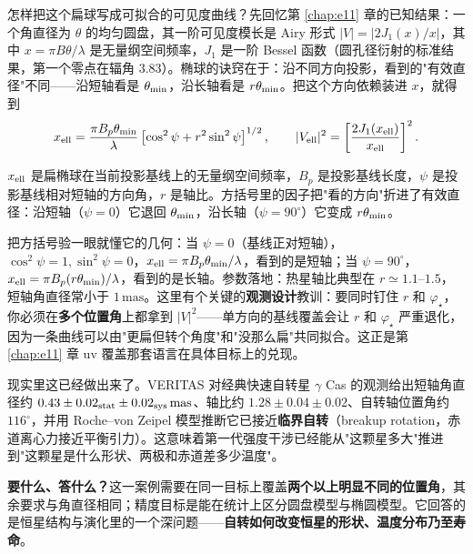 怎样把这个扁球写成可拟合的可见度曲线？先回忆第 \ref{chap:e11} 章的已知结果：一个角直径为 \(\theta\) 的均匀圆盘，其一阶可见度模长是 Airy 形式 \(|V|=|2J_1(x)/x|\)，其中 \(x=\pi B\theta/\lambda\) 是无量纲空间频率，\(J_1\) 是一阶 Bessel 函数（圆孔径衍射的标准结果，第一个零点在辐角 \(3.83\)）。椭球的诀窍在于：沿不同方向投影，看到的"有效直径"不同——沿短轴看是 \(\theta_{\rm min}\)，沿长轴看是 \(r\theta_{\rm min}\)。把这个方向依赖装进 \(x\)，就得到
\begin{equation}
  x_{\rm ell}
  =
  \frac{\pi B_p\theta_{\rm min}}{\lambda}
  \left[
  \cos^2\psi
  +
  r^2\sin^2\psi
  \right]^{1/2},
  \qquad
  |V_{\rm ell}|^2
  =
  \left[\frac{2J_1(x_{\rm ell})}{x_{\rm ell}}\right]^2 .
  \label{eq:e25-elliptical-visibility}
\end{equation}
\begin{formulaexplain}
\(x_{\rm ell}\) 是扁椭球在当前投影基线上的无量纲空间频率，\(B_p\) 是投影基线长度，\(\psi\) 是投影基线相对短轴的方向角，\(r\) 是轴比。方括号里的因子把"看的方向"折进了有效直径：沿短轴（\(\psi=0\)）它退回 \(\theta_{\rm min}\)，沿长轴（\(\psi=90^\circ\)）它变成 \(r\theta_{\rm min}\)。
\end{formulaexplain}
把方括号验一眼就懂它的几何：当 \(\psi=0\)（基线正对短轴），\(\cos^2\psi=1,\sin^2\psi=0\)，\(x_{\rm ell}=\pi B_p\theta_{\rm min}/\lambda\)，看到的是短轴；当 \(\psi=90^\circ\)，\(x_{\rm ell}=\pi B_p(r\theta_{\rm min})/\lambda\)，看到的是长轴。参数落地：热星轴比典型在 \(r\simeq1.1\text{--}1.5\)，短轴角直径常小于 \(1\,\mathrm{mas}\)。这里有个关键的\textbf{观测设计}教训：要同时钉住 \(r\) 和 \(\varphi_\star\)，你必须在\textbf{多个位置角}上都拿到 \(|V|^2\)——单方向的基线覆盖会让 \(r\) 和 \(\varphi_\star\) 严重退化，因为一条曲线可以由"更扁但转个角度"和"没那么扁"共同拟合。这正是第 \ref{chap:e11} 章 uv 覆盖那套语言在具体目标上的兑现。

现实里这已经做出来了。VERITAS 对经典快速自转星 \(\gamma\) Cas 的观测给出短轴角直径约 \(0.43\pm0.02_{\rm stat}\pm0.02_{\rm sys}\,\mathrm{mas}\)、轴比约 \(1.28\pm0.04\pm0.02\)、自转轴位置角约 \(116^\circ\)，并用 Roche--von Zeipel 模型推断它已接近\textbf{临界自转}（breakup rotation，赤道离心力接近平衡引力）\citep{2025ApJ...995..191A}。这意味着第一代强度干涉已经能从"这颗星多大"推进到"这颗星是什么形状、两极和赤道差多少温度"。

\textbf{要什么、答什么？}这一案例需要在同一目标上覆盖\textbf{两个以上明显不同的位置角}，其余要求与角直径相同；精度目标是能在统计上区分圆盘模型与椭圆模型。它回答的是恒星结构与演化里的一个深问题——\textbf{自转如何改变恒星的形状、温度分布乃至寿命}。

